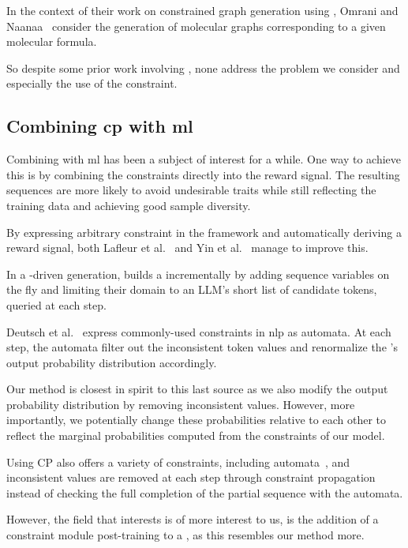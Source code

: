 \documentclass[../Document.tex]{subfiles}
\begin{document}
In the context of their work on constrained graph generation using \cp, Omrani and\\ Naanaa~\cite{DBLP:journals/constraints/OmraniN20} consider the generation of molecular graphs corresponding to a given molecular formula.

So despite some prior work involving \cp, none address the problem we consider and especially the use of the \grammar constraint.


\subsection{Combining \acrshort{cp} with \acrshort{ml}}
\label{sec:lit-review/gpt+cp}
Combining \cp with \gls{ml} has been a subject of interest for a while.
One way to achieve this is by combining the constraints directly into the reward signal. The resulting sequences are more likely to avoid undesirable traits while still reflecting the training data and achieving good sample diversity.

By expressing arbitrary constraint in the \cpbp framework and automatically deriving a reward signal, both Lafleur et al.~\cite{DBLP:conf/cp/LafleurCP22} and Yin et al.~\cite{DBLP:conf/cpaior/YinCP24} manage to improve this.

In a \cp-driven generation, \cite{DBLP:conf/cp/ReginMB24} builds a \csp incrementally by adding sequence variables on the fly and limiting their domain to an LLM's short list of candidate tokens, queried at each step.

Deutsch et al.~\cite{deutsch2019general} express commonly-used constraints in \gls{nlp} as automata. At each step, the automata filter out the inconsistent token values and renormalize the \nn's output probability distribution accordingly.

Our method is closest in spirit to this last source as we also modify the output probability distribution by removing inconsistent values. However, more importantly, we potentially change these probabilities relative to each other to reflect the marginal probabilities computed from the constraints of our \cp model.

Using CP also offers a variety of constraints, including automata~\cite{DBLP:conf/cp/Pesant04}, and inconsistent values are removed at each step through constraint propagation instead of checking the full completion of the partial sequence with the automata.

However, the field that interests is of more interest to us, is the addition of a constraint module post-training to a \nn, as this resembles our method more.
\end{document}
